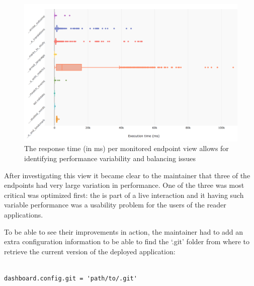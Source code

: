 \documentclass[conference]{IEEEtran}
\begin{document}
  \begin{figure}[!ht]
    \centering
    \includegraphics[width=\linewidth]{endpoint_performance.png}
    \caption{The response time (in ms) per monitored endpoint view allows for identifying performance variability and balancing issues}
    \label{fig:ep}
  \end{figure}

  After investigating this view it became clear to the maintainer that three of the endpoints had very large variation in performance. One of the three was most critical was optimized first: the \epTranslations is part of a live interaction and it having such variable performance was a usability problem for the users of the reader applications. 



  \niceseparator

  To be able to see their improvements in action, the maintainer had to add an extra configuration information to be able to find the `.git' folder from where to retrieve the current version of the deployed application: 

  \begin{lstlisting}[caption=Configuring the \tool with the path to the .git folder enables the generation of evolutionary performance graphs, style=custompython]

dashboard.config.git = 'path/to/.git'


    \end{lstlisting}
\end{document}
